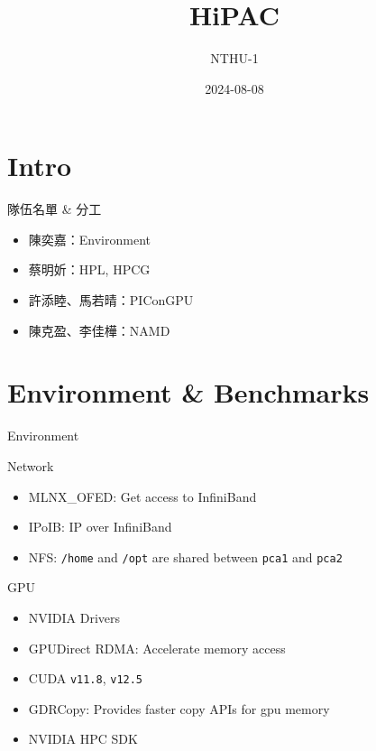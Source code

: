 \documentclass[aspectratio=169]{beamer}
\title{HiPAC}
\author{NTHU-1}
\date{2024-08-08}
\begin{document}
    \begin{frame}
        \titlepage
    \end{frame}

    \section{Intro}
    \begin{frame}{隊伍名單 \& 分工}
        \begin{itemize}
            \item 陳奕嘉：Environment
            \item 蔡明妡：HPL, HPCG
            \item 許添睦、馬若晴：PIConGPU
            \item 陳克盈、李佳樺：NAMD
        \end{itemize}
    \end{frame}

    \section{Environment \& Benchmarks}
    \begin{frame}{Environment}
        \begin{block}{Network}
            \begin{itemize}
                \item MLNX\_OFED: Get access to InfiniBand
                \item IPoIB: IP over InfiniBand
                \item NFS: \texttt{/home} and \texttt{/opt} are shared between \texttt{pca1} and \texttt{pca2}
            \end{itemize}
        \end{block}
        \begin{block}{GPU}
            \begin{itemize}
                \item NVIDIA Drivers
                \item GPUDirect RDMA: Accelerate memory access
                \item CUDA \texttt{v11.8}, \texttt{v12.5}
                \item GDRCopy: Provides faster copy APIs for gpu memory
                \item NVIDIA HPC SDK
            \end{itemize}
        \end{block}
    \end{frame}
    
\end{document}
